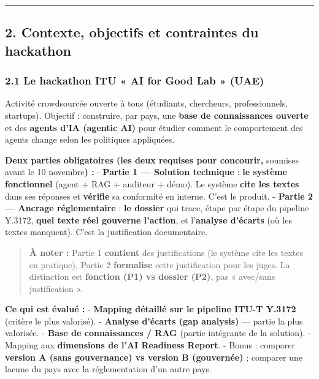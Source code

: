 \documentclass[
]{article}
\begin{document}
\begin{center}\rule{0.5\linewidth}{0.5pt}\end{center}

\subsection{2. Contexte, objectifs et contraintes du
hackathon}\label{contexte-objectifs-et-contraintes-du-hackathon}

\subsubsection{2.1 Le hackathon ITU « AI for Good Lab »
(UAE)}\label{le-hackathon-itu-ai-for-good-lab-uae}

Activité crowdsourcée ouverte à tous (étudiants, chercheurs,
professionnels, startups). Objectif : construire, par pays, une
\textbf{base de connaissances ouverte} et des \textbf{agents d'IA
(agentic AI)} pour étudier comment le comportement des agents change
selon les politiques appliquées.

\textbf{Deux parties obligatoires (les deux requises pour concourir,
}soumises avant le 10 novembre\textbf{) :} - \textbf{Partie 1 ---
Solution technique} : \textbf{le système fonctionnel} (agent + RAG +
auditeur + démo). Le système \textbf{cite les textes} dans ses réponses
et \textbf{vérifie} sa conformité en interne. C'est le produit. -
\textbf{Partie 2 --- Ancrage réglementaire} : \textbf{le dossier} qui
trace, étape par étape du pipeline Y.3172, \textbf{quel texte réel
gouverne l'action}, et l'\textbf{analyse d'écarts} (où les textes
manquent). C'est la justification documentaire.

\begin{quote}
\textbf{À noter :} Partie 1 \textbf{contient} des justifications (le
système cite les textes en pratique), Partie 2 \textbf{formalise} cette
justification pour les juges. La distinction est \textbf{fonction (P1)
vs dossier (P2)}, pas « avec/sans justification ».
\end{quote}

\textbf{Ce qui est évalué :} - \textbf{Mapping détaillé sur le pipeline
ITU-T Y.3172} (critère le plus valorisé). - \textbf{Analyse d'écarts
(gap analysis)} --- partie la plus valorisée. - \textbf{Base de
connaissances / RAG} (partie intégrante de la solution). - Mapping aux
\textbf{dimensions de l'AI Readiness Report}. - Bonus : comparer
\textbf{version A (sans gouvernance) vs version B (gouvernée)} ;
comparer une lacune du pays avec la réglementation d'un autre pays.
\end{document}
